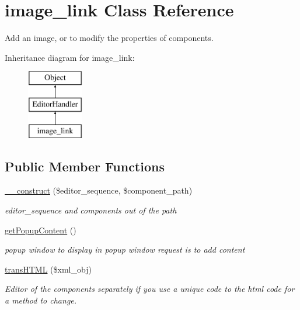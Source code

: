 \hypertarget{classimage__link}{\section{image\-\_\-link Class Reference}
\label{classimage__link}
}


Add an image, or to modify the properties of components.  


Inheritance diagram for image\-\_\-link\-:\begin{figure}[H]
\begin{center}
\leavevmode
\includegraphics[height=3.000000cm]{classimage__link}
\end{center}
\end{figure}
\subsection*{Public Member Functions}
\begin{DoxyCompactItemize}
\item 
\hyperlink{classimage__link_a15f2ff6128ae7abca4be597224bdbf11}{\-\_\-\-\_\-construct} (\$editor\-\_\-sequence, \$component\-\_\-path)
\begin{DoxyCompactList}\small\item\em editor\-\_\-sequence and components out of the path \end{DoxyCompactList}\item 
\hyperlink{classimage__link_a394ef807a2b750c5b3f0041eb7ab4aaf}{get\-Popup\-Content} ()
\begin{DoxyCompactList}\small\item\em popup window to display in popup window request is to add content \end{DoxyCompactList}\item 
\hyperlink{classimage__link_ac26727c59ca0972802129f4a7b1060cb}{trans\-H\-T\-M\-L} (\$xml\-\_\-obj)
\begin{DoxyCompactList}\small\item\em Editor of the components separately if you use a unique code to the html code for a method to change. \end{DoxyCompactList}\end{DoxyCompactItemize}
